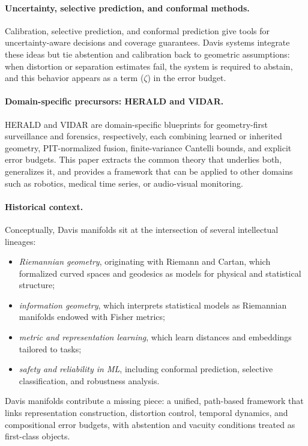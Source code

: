 \documentclass[11pt]{article}
\begin{document}
\paragraph{Uncertainty, selective prediction, and conformal methods.}
Calibration, selective prediction, and conformal prediction give tools for uncertainty-aware decisions and coverage guarantees. Davis systems integrate these ideas but tie abstention and calibration back to geometric assumptions: when distortion or separation estimates fail, the system is required to abstain, and this behavior appears as a term ($\zeta$) in the error budget.

\paragraph{Domain-specific precursors: HERALD and VIDAR.}
HERALD and VIDAR are domain-specific blueprints for geometry-first surveillance and forensics, respectively, each combining learned or inherited geometry, PIT-normalized fusion, finite-variance Cantelli bounds, and explicit error budgets.  This paper extracts the common theory that underlies both, generalizes it, and provides a framework that can be applied to other domains such as robotics, medical time series, or audio-visual monitoring.

\paragraph{Historical context.}
Conceptually, Davis manifolds sit at the intersection of several intellectual lineages:
\begin{itemize}[leftmargin=*]
    \item \emph{Riemannian geometry}, originating with Riemann and Cartan, which formalized curved spaces and geodesics as models for physical and statistical structure;
    \item \emph{information geometry}, which interprets statistical models as Riemannian manifolds endowed with Fisher metrics;
    \item \emph{metric and representation learning}, which learn distances and embeddings tailored to tasks;
    \item \emph{safety and reliability in ML}, including conformal prediction, selective classification, and robustness analysis.
\end{itemize}
Davis manifolds contribute a missing piece: a unified, path-based framework that links representation construction, distortion control, temporal dynamics, and compositional error budgets, with abstention and vacuity conditions treated as first-class objects.
\end{document}
